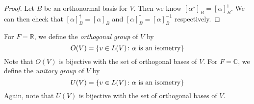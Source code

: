 \begin{proof}
	Let \( B \) be an orthonormal basis for \( V \).
	Then we know \( [\alpha^\star]_B = [\alpha]_B^\dagger \).
	We can then check that \( [\alpha]_B^\dagger = [\alpha]_B \) and \( [\alpha]_B^\dagger = [\alpha]_B^{-1} \) respectively.
\end{proof}
\begin{definition}
	For \( F = \mathbb R \), we define the \textit{orthogonal group} of \( V \) by
	\[
		O(V) = \qty{ v \in L(V) \colon \alpha \text{ is an isometry} }
	\]
	Note that \( O(V) \) is bijective with the set of orthogonal bases of \( V \).
	For \( F = \mathbb C \), we define the \textit{unitary group} of \( V \) by
	\[
		U(V) = \qty{ v \in L(V) \colon \alpha \text{ is an isometry} }
	\]
	Again, note that \( U(V) \) is bijective with the set of orthogonal bases of \( V \).
\end{definition}
